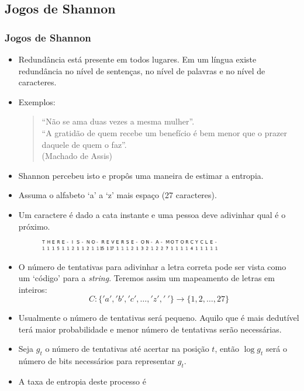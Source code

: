\subsection{Jogos de Shannon}
\begin{frame}[allowframebreaks]
  \frametitle{Jogos de Shannon}
  \begin{itemize}
  \item Redundância está presente em todos lugares. Em um língua existe redundância no nível de sentenças, 
	no nível de palavras e no nível de caracteres.
  \item Exemplos:
	\begin{quote}
	``Não se ama duas vezes a mesma {\color{white}mulher}''. \\
	``A gratidão de quem recebe um benefício é bem menor que o prazer daquele de quem o {\color{white}faz}''. \\
	\hfill(Machado de Assis)
	\end{quote}
  \item Shannon percebeu isto e propôs uma maneira de estimar a entropia.
  \item Assuma o alfabeto `a' a `z' mais espaço (27 caracteres).
  \item Um caractere é dado a cata instante e uma pessoa deve adivinhar qual é o próximo.
                \begin{figure}[h!]
                \centering
                \includegraphics[width=0.75\textwidth]{images/shannonguessgame.pdf}
                \label{fig:shannonguessgame}
                \end{figure}
  \item O número de tentativas para adivinhar a letra correta pode ser vista como um `código' para a \textit{string}.
	Teremos assim um mapeamento de letras em inteiros:
	\begin{equation}
	C: \{'a','b','c', \ldots ,'z','\ '\} \rightarrow \{1,2,\ldots,27\}
	\end{equation}
  \item Usualmente o número de tentativas será pequeno. Aquilo que é mais dedutível terá maior probabilidade e menor número de tentativas
	serão necessárias.
  \item Seja $g_t$ o número de tentativas até acertar na posição $t$, então $\log g_t$ será o número de bits necessários para
	representar $g_t$.
  \item A taxa de entropia deste processo é

\end{itemize}
\end{frame}
